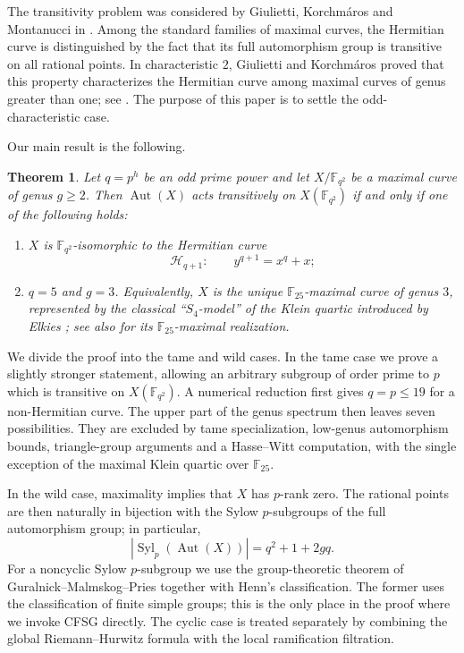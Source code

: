 \documentclass[11pt]{amsart}
\newtheorem{theorem}{Theorem}[section]
\theoremstyle{remark}
\newcommand{\F}{\mathbb F}
\newcommand{\Aut}{\operatorname{Aut}}
\newcommand{\Syl}{\operatorname{Syl}}
\newcommand{\cH}{\mathcal H}
\begin{document}
The transitivity problem was considered by Giulietti, Korchm\'aros and
Montanucci in \cite[Section~6.1]{GKMSurvey}.  Among the standard
families of maximal curves, the Hermitian curve is distinguished by the
fact that its full automorphism group is transitive on all rational
points.  In characteristic $2$, Giulietti and Korchm\'aros proved that
this property characterizes the Hermitian curve among maximal curves of
genus greater than one; see \cite[Theorem~9.1]{GK2010}.  The purpose of
this paper is to settle the odd-characteristic case.

Our main result is the following.

\begin{theorem}\label{thm:main}
Let $q=p^h$ be an odd prime power and let $X/\F_{q^2}$ be a maximal
curve of genus $g\ge2$.  Then $\Aut(X)$ acts transitively on
$X(\F_{q^2})$ if and only if one of the following holds:
\begin{enumerate}[label=\textup{(\roman*)}]
\item $X$ is $\F_{q^2}$-isomorphic to the Hermitian curve
\[
             \cH_{q+1}:\qquad y^{q+1}=x^q+x;
\]
\item $q=5$ and $g=3$. Equivalently, $X$ is the unique
$\F_{25}$-maximal curve of genus $3$, represented by the classical
``$S_4$-model'' of the Klein quartic introduced by Elkies
\cite[(1.11)]{ElkiesKlein}; see also \cite[\S3.1]{BTT} for its
$\F_{25}$-maximal realization.
\end{enumerate}
\end{theorem}

We divide the proof into the tame and wild cases.  In the tame case we
prove a slightly stronger statement, allowing an arbitrary subgroup of
order prime to $p$ which is transitive on $X(\F_{q^2})$.  A numerical
reduction first gives $q=p\le19$ for a non-Hermitian curve.  The upper
part of the genus spectrum then leaves seven possibilities.  They are
excluded by tame specialization, low-genus automorphism bounds,
triangle-group arguments and a Hasse--Witt computation, with the
single exception of the maximal Klein quartic over $\F_{25}$.

In the wild case, maximality implies that $X$ has $p$-rank zero.  The
rational points are then naturally in bijection with the Sylow
$p$-subgroups of the full automorphism group; in particular,
\[
   |\Syl_p(\Aut(X))|=q^2+1+2gq.
\]
For a noncyclic Sylow $p$-subgroup we use the group-theoretic theorem of
Guralnick--Malmskog--Pries together with Henn's classification.  The
former uses the classification of finite simple groups; this is the
only place in the proof where we invoke CFSG directly.  The cyclic case
is treated separately by combining the global Riemann--Hurwitz formula
with the local ramification filtration.
\end{document}
